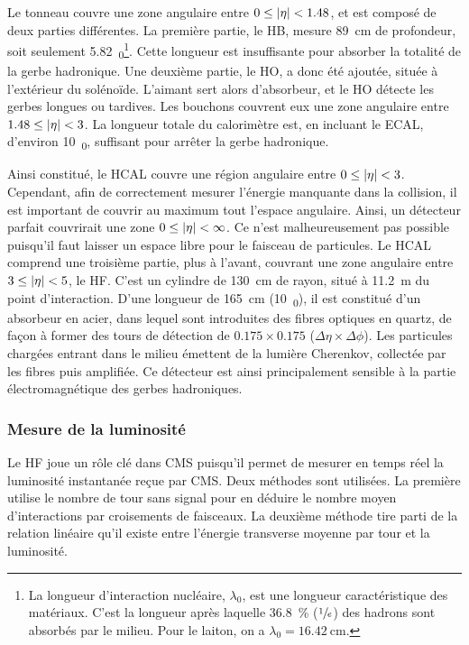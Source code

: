 Le tonneau couvre une zone angulaire entre $0 \leq \lvert \eta \rvert < \num{1.48}$, et est composé de deux parties différentes. La première partie, le HB, mesure \SI{89}{\cm} de profondeur, soit seulement \SI{5.82}{\lambda_0}\footnote{La longueur d'interaction nucléaire, $\lambda_0$, est une longueur caractéristique des matériaux. C'est la longueur après laquelle \SI{36.8}{\%} ($\sfrac{1}{e}$) des hadrons sont absorbés par le milieu. Pour le laiton, on a $\lambda_0 = \SI{16.42}{\cm}$.}. Cette longueur est insuffisante pour absorber la totalité de la gerbe hadronique. Une deuxième partie, le HO, a donc été ajoutée, située à l'extérieur du solénoïde. L'aimant sert alors d'absorbeur, et le HO détecte les gerbes longues ou tardives. Les bouchons couvrent eux une zone angulaire entre $1.48 \leq \lvert \eta \rvert < \num{3}$. La longueur totale du calorimètre est, en incluant le ECAL, d'environ \SI{10}{\lambda_0}, suffisant pour arrêter la gerbe hadronique.

\bigskip

Ainsi constitué, le HCAL couvre une région angulaire entre $0 \leq \lvert \eta \rvert < \num{3}$. Cependant, afin de correctement mesurer l'énergie manquante dans la collision, il est important de couvrir au maximum tout l'espace angulaire. Ainsi, un détecteur parfait couvrirait une zone $0 \leq \lvert \eta \rvert < \infty$. Ce n'est malheureusement pas possible puisqu'il faut laisser un espace libre pour le faisceau de particules. Le HCAL comprend une troisième partie, plus à l'avant, couvrant une zone angulaire entre $\num{3} \leq \lvert \eta \rvert < \num{5}$, le HF. C'est un cylindre de \SI{130}{\cm} de rayon, situé à \SI{11.2}{\m} du point d'interaction. D'une longueur de \SI{165}{\cm} (\tilde \SI{10}{\lambda_0}), il est constitué d'un absorbeur en acier, dans lequel sont introduites des fibres optiques en quartz, de façon à former des tours de détection de $\num{0.175} \times \num{0.175}$ ($\Delta\eta \times \Delta\phi$). Les particules chargées entrant dans le milieu émettent de la lumière Cherenkov, collectée par les fibres puis amplifiée. Ce détecteur est ainsi principalement sensible à la partie électromagnétique des gerbes hadroniques.

\subsubsection{Mesure de la luminosité}

Le HF joue un rôle clé dans CMS puisqu'il permet de mesurer en temps réel la luminosité instantanée reçue par CMS. Deux méthodes sont utilisées. La première utilise le nombre de tour sans signal pour en déduire le nombre moyen d'interactions par croisements de faisceaux. La deuxième méthode tire parti de la relation linéaire qu'il existe entre l'énergie transverse moyenne par tour et la luminosité.


